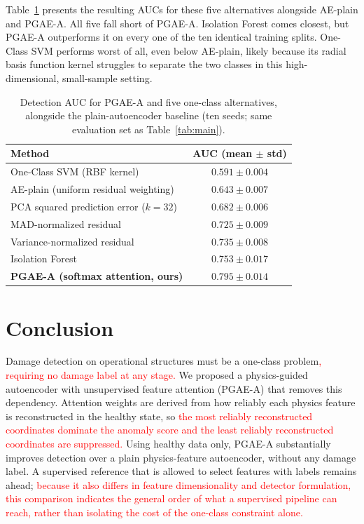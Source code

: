 \documentclass[11pt,a4paper]{article}
\begin{document}
Table~\ref{tab:baselines} presents the resulting AUCs for these five
alternatives alongside AE-plain and PGAE-A. All five fall short of PGAE-A.
Isolation Forest comes closest, but PGAE-A outperforms it on every one of the
ten identical training splits. One-Class SVM performs worst of all, even
below AE-plain, likely because its radial basis function kernel struggles to
separate the two classes in this high-dimensional, small-sample setting.

\begin{table}[htbp]
\color{red}
\centering
{}
\caption{Detection AUC for PGAE-A and five one-class alternatives, alongside
the plain-autoencoder baseline (ten seeds; same evaluation set as
Table~\ref{tab:main}).}
\label{tab:baselines}
\small
\begin{tabular}{@{}lc@{}}
\toprule
\textbf{Method} & \textbf{AUC (mean $\pm$ std)} \\
\midrule
One-Class SVM (RBF kernel)            & $0.591 \pm 0.004$ \\
AE-plain (uniform residual weighting) & $0.643 \pm 0.007$ \\
PCA squared prediction error ($k=32$) & $0.682 \pm 0.006$ \\
MAD-normalized residual               & $0.725 \pm 0.009$ \\
Variance-normalized residual          & $0.735 \pm 0.008$ \\
Isolation Forest                      & $0.753 \pm 0.017$ \\
\textbf{PGAE-A (softmax attention, ours)} & $\mathbf{0.795 \pm 0.014}$ \\
\bottomrule
\end{tabular}
\end{table}

\FloatBarrier
\color{black}
\section{Conclusion}
\label{sec:conclusion}
Damage detection on operational structures must be a one-class
problem\textcolor{red}{, requiring no damage label at any stage.} We proposed a
physics-guided autoencoder with unsupervised feature attention (PGAE-A) that
removes this dependency. Attention weights are derived from how reliably each
physics feature is reconstructed in the healthy state, so
\textcolor{red}{the most reliably reconstructed coordinates dominate the
anomaly score and the least reliably reconstructed coordinates are
suppressed.} Using healthy data only, PGAE-A substantially improves detection over a plain
physics-feature autoencoder, without any damage label. A supervised reference
that is allowed to select features with labels remains ahead;
\textcolor{red}{because it also differs in feature dimensionality and
detector formulation, this comparison indicates the general order of what a
supervised pipeline can reach, rather than isolating the cost of the
one-class constraint alone.}
\end{document}
